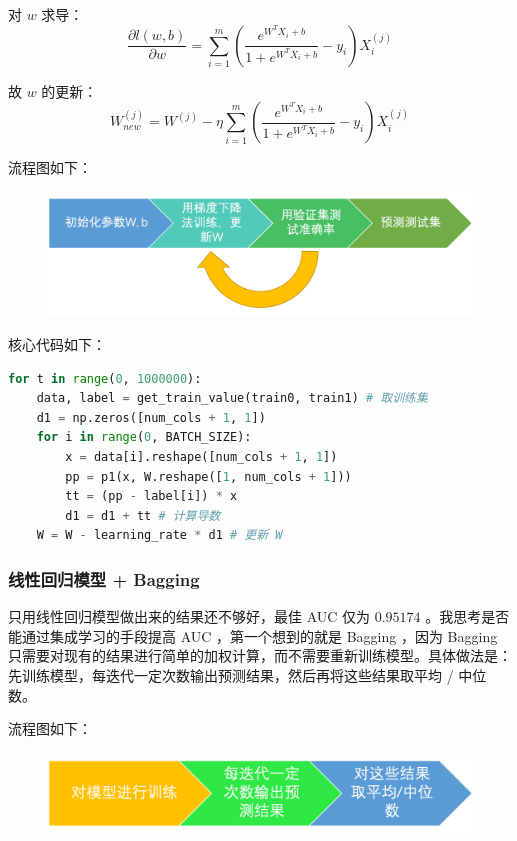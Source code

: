 \documentclass{article}
\begin{document}
对 $w$ 求导：
$$\frac{\partial l(w, b)}{\partial w} = \sum\limits_{i=1}^{m} (\frac{e^{W^TX_i + b}}{1 + e^{W^TX_i + b}} - y_i) X_i^{(j)}$$

故 $w$ 的更新：
$$W_{new}^{(j)} = W^{(j)} - \eta \sum\limits_{i=1}^{m} (\frac{e^{W^TX_i + b}}{1 + e^{W^TX_i + b}} - y_i) X_i^{(j)}$$

流程图如下：

\begin{figure}[!h]
\centering
\includegraphics[scale=0.5]{3.png}
\end{figure}

核心代码如下：

\begin{lstlisting}[language=python]
for t in range(0, 1000000):
	data, label = get_train_value(train0, train1) # 取训练集
	d1 = np.zeros([num_cols + 1, 1])
	for i in range(0, BATCH_SIZE):
		x = data[i].reshape([num_cols + 1, 1])
		pp = p1(x, W.reshape([1, num_cols + 1]))
		tt = (pp - label[i]) * x
		d1 = d1 + tt # 计算导数
	W = W - learning_rate * d1 # 更新 W
\end{lstlisting}

\subsubsection{线性回归模型 + Bagging}

只用线性回归模型做出来的结果还不够好，最佳 AUC 仅为 $0.95174$ 。我思考是否能通过集成学习的手段提高 AUC ，第一个想到的就是 Bagging ，因为 Bagging 只需要对现有的结果进行简单的加权计算，而不需要重新训练模型。具体做法是：先训练模型，每迭代一定次数输出预测结果，然后再将这些结果取平均 / 中位数。

流程图如下：

\begin{figure}[!h]
\centering
\includegraphics[scale=0.5]{4.png}
\end{figure}
\end{document}
